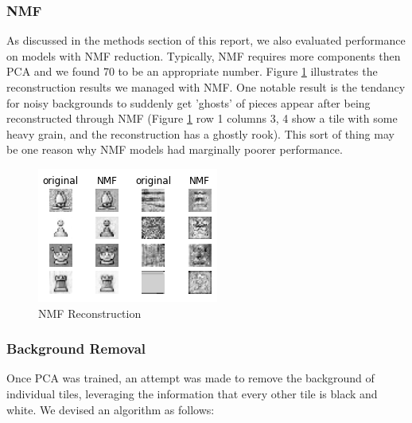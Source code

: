 \documentclass{article}
\begin{document}
\begin{multicols}{2}
\subsubsection{NMF}
As discussed in the methods section of this report, we also evaluated performance on models with NMF reduction. Typically, NMF requires more components then PCA and we found 70 to be an appropriate number. Figure \ref{fig:NMF} illustrates the reconstruction results we managed with NMF. One notable result is the tendancy for noisy backgrounds to suddenly get 'ghosts' of pieces appear after being reconstructed through NMF (Figure \ref{fig:NMF} row 1 columns 3, 4 show a tile with some heavy grain, and the reconstruction has a ghostly rook). This sort of thing may be one reason why NMF models had marginally poorer performance.
\begin{figure}[H]
\centering
\includegraphics[width=\linewidth]{NMF_Reconstruction.png}
\caption{NMF Reconstruction}
\label{fig:NMF}
\end{figure}

\subsubsection{Background Removal}
Once PCA was trained, an attempt was made to remove the background of individual tiles, leveraging the information that every other tile is black and white. We devised an algorithm as follows:


\end{multicols}
\end{document}
